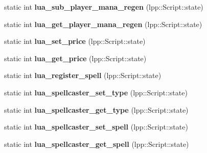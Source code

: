 \begin{DoxyCompactItemize}
\item 
static int {\bfseries lua\+\_\+sub\+\_\+player\+\_\+mana\+\_\+regen} (lpp\+::\+Script\+::state)\hypertarget{class_lua_interface_a1c9d8debc4d54769c55b2632149cf185}{}\label{class_lua_interface_a1c9d8debc4d54769c55b2632149cf185}

\item 
static int {\bfseries lua\+\_\+get\+\_\+player\+\_\+mana\+\_\+regen} (lpp\+::\+Script\+::state)\hypertarget{class_lua_interface_a0aa2921c00ef4344a6c14e4d28bd773a}{}\label{class_lua_interface_a0aa2921c00ef4344a6c14e4d28bd773a}

\item 
static int {\bfseries lua\+\_\+set\+\_\+price} (lpp\+::\+Script\+::state)\hypertarget{class_lua_interface_a3268d5bd954ac2e1fcc5ce624a32bdfe}{}\label{class_lua_interface_a3268d5bd954ac2e1fcc5ce624a32bdfe}

\item 
static int {\bfseries lua\+\_\+get\+\_\+price} (lpp\+::\+Script\+::state)\hypertarget{class_lua_interface_a32c5fc22d72cf2bd892b9579380ea34a}{}\label{class_lua_interface_a32c5fc22d72cf2bd892b9579380ea34a}

\item 
static int {\bfseries lua\+\_\+register\+\_\+spell} (lpp\+::\+Script\+::state)\hypertarget{class_lua_interface_a9600935976d0e1c8d77ad7d61a49f3b9}{}\label{class_lua_interface_a9600935976d0e1c8d77ad7d61a49f3b9}

\item 
static int {\bfseries lua\+\_\+spellcaster\+\_\+set\+\_\+type} (lpp\+::\+Script\+::state)\hypertarget{class_lua_interface_a7550a0c9071e0b9856c997cc75189f5a}{}\label{class_lua_interface_a7550a0c9071e0b9856c997cc75189f5a}

\item 
static int {\bfseries lua\+\_\+spellcaster\+\_\+get\+\_\+type} (lpp\+::\+Script\+::state)\hypertarget{class_lua_interface_a6f282e11b7b48c4e0096dfa7522c8e33}{}\label{class_lua_interface_a6f282e11b7b48c4e0096dfa7522c8e33}

\item 
static int {\bfseries lua\+\_\+spellcaster\+\_\+set\+\_\+spell} (lpp\+::\+Script\+::state)\hypertarget{class_lua_interface_af337d131f30466fe0bd8f7d6cafc611c}{}\label{class_lua_interface_af337d131f30466fe0bd8f7d6cafc611c}

\item 
static int {\bfseries lua\+\_\+spellcaster\+\_\+get\+\_\+spell} (lpp\+::\+Script\+::state)\hypertarget{class_lua_interface_a5e2af4a049f11b17439226937d46f4a2}{}\label{class_lua_interface_a5e2af4a049f11b17439226937d46f4a2}


\end{DoxyCompactItemize}
